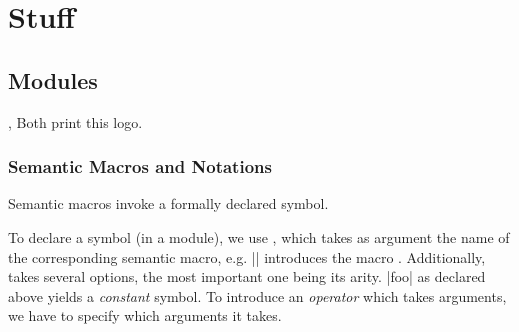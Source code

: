 \clearpage

{%
  \def\\{:}%
  \tableofcontents
}

\clearpage
{}	
	
\fi

\chapter{Stuff}

\section{Modules}


\begin{function}{\sTeX , \stex}
  Both print this \stex logo.
\end{function}

 \subsection{Semantic Macros and Notations}

 Semantic macros invoke a formally declared symbol.

 To declare a symbol (in a module), we use ,
 which takes as argument the name of the corresponding
 semantic macro, e.g. || introduces the macro
 . Additionally,  takes several options,
 the most important one being its arity. |foo| as declared above
 yields a \emph{constant} symbol. To introduce an \emph{operator}
 which takes arguments, we have to specify which arguments it takes.

